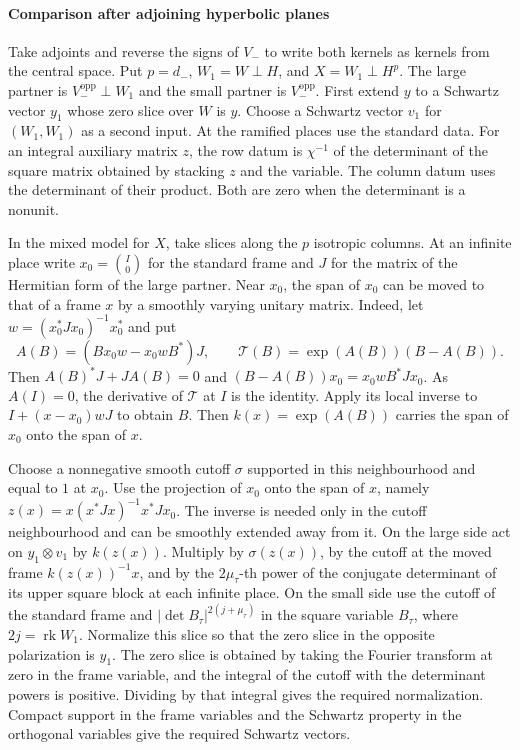 \paragraph{Comparison after adjoining hyperbolic planes}
Take adjoints and reverse the signs of \(V_-\) to write both kernels as kernels
from the central space. Put \(p=d_-\), \(W_1=W\perp H\), and \(X=W_1\perp H^p\).
The large partner is \(V_-^{\mathrm{opp}}\perp W_1\) and the small partner
is \(V_-^{\mathrm{opp}}\). First extend \(y\) to a Schwartz vector \(y_1\)
whose zero slice over \(W\) is \(y\). Choose a Schwartz vector \(v_1\)
for \((W_1,W_1)\) as a second input. At the ramified places use the standard
data. For an integral auxiliary matrix \(z\), the row datum is \(\chi^{-1}\)
of the determinant of the square matrix obtained by stacking \(z\) and the
variable. The column datum uses the determinant of their product. Both are
zero when the determinant is a nonunit.

In the mixed model for \(X\), take slices along the \(p\) isotropic columns.
At an infinite place write \(x_0=\binom{I}{0}\) for the standard frame and \(J\)
for the matrix of the Hermitian form of the large partner. Near \(x_0\), the
span of \(x_0\) can be moved to that of a frame \(x\) by a smoothly varying
unitary matrix. Indeed, let \(w=(x_0^*Jx_0)^{-1}x_0^*\) and put
\[
 A(B)=(Bx_0w-x_0wB^*)J,\qquad
 \mathcal T(B)=\exp(A(B))(B-A(B)).
\]
Then \(A(B)^*J+JA(B)=0\) and \((B-A(B))x_0=x_0wB^*Jx_0\).
As \(A(I)=0\), the derivative of \(\mathcal T\) at \(I\) is the identity.
Apply its local inverse to \(I+(x-x_0)wJ\) to obtain \(B\).
Then \(k(x)=\exp(A(B))\) carries the span of \(x_0\) onto the span of \(x\).

Choose a nonnegative smooth cutoff \(\sigma\) supported in this neighbourhood
and equal to \(1\) at \(x_0\). Use the projection of \(x_0\) onto the span of
\(x\), namely \(z(x)=x(x^*Jx)^{-1}x^*Jx_0\).
The inverse is needed only in the cutoff neighbourhood and can be smoothly
extended away from it. On the large side act on \(y_1\otimes v_1\) by
\(k(z(x))\). Multiply by \(\sigma(z(x))\), by the cutoff at the moved frame
\(k(z(x))^{-1}x\), and by the \(2\mu_\tau\)-th power of the conjugate
determinant of its upper square block at each infinite place.
On the small side use the cutoff of the standard frame and
\(|\det B_\tau|^{2(j+\mu_\tau)}\) in the square variable \(B_\tau\), where
\(2j=\operatorname{rk}W_1\). Normalize this slice so that the zero slice
in the opposite polarization is \(y_1\). The zero slice is obtained by taking
the Fourier transform at zero in the frame variable, and the integral of the
cutoff with the determinant powers is positive. Dividing by that integral
gives the required normalization. Compact support in the frame variables
and the Schwartz property in the orthogonal variables give the required
Schwartz vectors.

